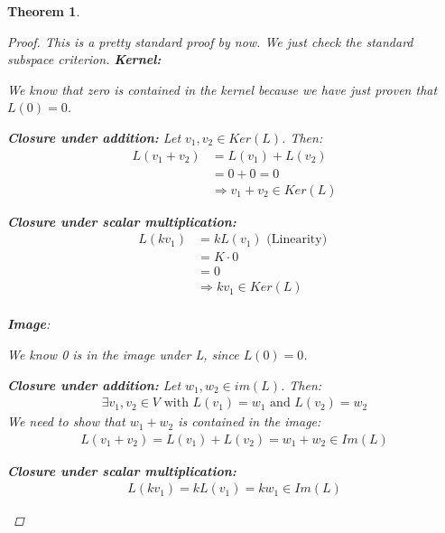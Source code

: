 \documentclass[a4paper, 12pt]{article}
\newtheorem{theorem}{Theorem}
\theoremstyle{definition}
\theoremstyle{definition}
\theoremstyle{definition}
\theoremstyle{definition}
\newenvironment{enumerate_tight}{
	\begin{enumerate}
		\setlength{\itemsep}{0pt}
		\setlength{\parskip}{0pt}
	}{\end{enumerate}}
\begin{document}
{\begin{theorem}
	\begin{proof}
		This is a pretty standard proof by now. We just check the standard subspace criterion. 
		\newline
		\textbf{Kernel:}
		\begin{enumerate_tight}
			\item We know that zero is contained in the kernel because we have just proven that $L(0)= 0$. 
			\item \textbf{Closure under addition:} Let $v_1, v_2 \in Ker(L)$. Then: 
			\begin{align*}
				L(v_1 + v_2) & = L(v_1) + L(v_2) \\
				& = 0 + 0 = 0 \\
				& \Rightarrow v_1 + v_2 \in Ker(L) 
			\end{align*}
			\item \textbf{Closure under scalar multiplication:}
			\begin{align*}
				L(kv_1) &  = kL(v_1) \mbox{ (Linearity) } \\
						& = K \cdot 0 \\
						& = 0 \\
				 & \Rightarrow kv_1 \in Ker(L) \\
			\end{align*}
		\end{enumerate_tight}
	\textbf{Image}: 
	\begin{enumerate_tight}
		\item We know 0 is in the image under L, since $L(0) = 0$. 
		\item \textbf{Closure under addition:} Let $w_1, w_2 \in im(L)$. Then: 
		\begin{align*}
			\exists v_1, v_2 \in V \mbox{ with } L(v_1) = w_1 \mbox{ and } L(v_2) = w_2 
		\end{align*}
		We need to show that $w_1 + w_2$ is contained in the image: 
		\begin{align*}
			L(v_1 + v_2) = L(v_1) + L(v_2) = w_1 + w_2 \in Im(L) 
		\end{align*}
	\item \textbf{Closure under scalar multiplication:}
	\begin{align*}
		L(kv_1) = kL(v_1) = kw_1 \in Im(L) 
	\end{align*}
	\end{enumerate_tight} 
 
	\end{proof}
\end{theorem}

}
\end{document}
